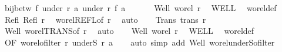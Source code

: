 \begin{isabellebody}
\ {\isachardoublequoteopen}bij{\isacharunderscore}{\kern0pt}betw\ f\ {\isacharparenleft}{\kern0pt}under\ r\ a{\isacharparenright}{\kern0pt}\ {\isacharparenleft}{\kern0pt}under\ r{\isacharprime}{\kern0pt}\ {\isacharparenleft}{\kern0pt}f\ a{\isacharparenright}{\kern0pt}{\isacharparenright}{\kern0pt}{\isachardoublequoteclose}\isanewline
%
\isadelimproof
%
\endisadelimproof
%
\isatagproof
{}\isamarkupfalse%
{\isacharminus}{\kern0pt}\isanewline
\ \ \isanewline
\ \ \isamarkupfalse%
\ Well{\isacharcolon}{\kern0pt}\ {\isachardoublequoteopen}wo{\isacharunderscore}{\kern0pt}rel\ r{\isachardoublequoteclose}\ \isamarkupfalse%
\ WELL\ \isamarkupfalse%
\ wo{\isacharunderscore}{\kern0pt}rel{\isacharunderscore}{\kern0pt}def\ \isacommand{{\isachardot}{\kern0pt}}\isamarkupfalse%
\isanewline
\ \ \isamarkupfalse%
\ Refl{\isacharcolon}{\kern0pt}\ {\isachardoublequoteopen}Refl\ r{\isachardoublequoteclose}\ \isamarkupfalse%
\ wo{\isacharunderscore}{\kern0pt}rel{\isachardot}{\kern0pt}REFL{\isacharbrackleft}{\kern0pt}of\ r{\isacharbrackright}{\kern0pt}\ \isamarkupfalse%
\ auto\isanewline
\ \ \isamarkupfalse%
\ Trans{\isacharcolon}{\kern0pt}\ {\isachardoublequoteopen}trans\ r{\isachardoublequoteclose}\ \isamarkupfalse%
\ Well\ wo{\isacharunderscore}{\kern0pt}rel{\isachardot}{\kern0pt}TRANS{\isacharbrackleft}{\kern0pt}of\ r{\isacharbrackright}{\kern0pt}\ \isamarkupfalse%
\ auto\isanewline
\ \ \isamarkupfalse%
\ Well{\isacharprime}{\kern0pt}{\isacharcolon}{\kern0pt}\ {\isachardoublequoteopen}wo{\isacharunderscore}{\kern0pt}rel\ r{\isacharprime}{\kern0pt}{\isachardoublequoteclose}\ \isamarkupfalse%
\ WELL{\isacharprime}{\kern0pt}\ \isamarkupfalse%
\ wo{\isacharunderscore}{\kern0pt}rel{\isacharunderscore}{\kern0pt}def\ \isacommand{{\isachardot}{\kern0pt}}\isamarkupfalse%
\isanewline
\ \ \isamarkupfalse%
\ OF{\isacharcolon}{\kern0pt}\ {\isachardoublequoteopen}wo{\isacharunderscore}{\kern0pt}rel{\isachardot}{\kern0pt}ofilter\ r\ {\isacharparenleft}{\kern0pt}underS\ r\ a{\isacharparenright}{\kern0pt}{\isachardoublequoteclose}\isanewline
\ \ \isamarkupfalse%
\ {\isacharparenleft}{\kern0pt}auto\ simp\ add{\isacharcolon}{\kern0pt}\ Well\ wo{\isacharunderscore}{\kern0pt}rel{\isachardot}{\kern0pt}underS{\isacharunderscore}{\kern0pt}ofilter{\isacharparenright}{\kern0pt}\isanewline
\ \ \isamarkupfalse%

\end{isabellebody}
